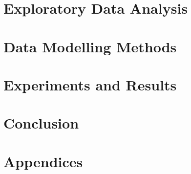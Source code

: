 \documentclass[a4paper,12pt,twoside]{report}
\begin{document}
\begin{onehalfspace}
\chapter{Exploratory Data Analysis}
\label{c:eda}


\clearpage
\chapter{Data Modelling Methods}
\label{c:methods}



\clearpage
\chapter{Experiments and Results}
\label{c:results}



\clearpage
\chapter{Conclusion}
\label{c:conclusion}


\clearpage
	\setcounter{chapter}{1}
	\fancyhf{}
	\rhead{\thepage}
\renewcommand{\thechapter}{\Alph{chapter}}
\chapter*{Appendices}
\label{chap_appendices}




\clearpage
	\fancyhf{}
	\rhead{\thepage}
	\lhead{\textbf{ \nouppercase{\leftmark}} }
{}
%
%
\printbibliography

\end{onehalfspace}
\end{document}
